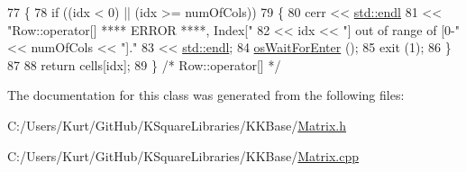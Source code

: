 \begin{DoxyCode}
77 \{
78   \textcolor{keywordflow}{if}  ((idx < 0)  ||  (idx >= numOfCols))
79   \{
80     cerr << \hyperlink{namespace_k_k_b_ad1f50f65af6adc8fa9e6f62d007818a8}{std::endl}
81          << \textcolor{stringliteral}{"Row::operator[]  **** ERROR ****,  Index["} 
82          << idx << \textcolor{stringliteral}{"]  out of range of [0-"} << numOfCols << \textcolor{stringliteral}{"]."}
83          << \hyperlink{namespace_k_k_b_ad1f50f65af6adc8fa9e6f62d007818a8}{std::endl};
84     \hyperlink{namespace_k_k_b_a255aa69aade7f429585349d08973e09f}{osWaitForEnter} ();
85     exit (1);
86   \}
87 
88   \textcolor{keywordflow}{return}  cells[idx];
89 \}  \textcolor{comment}{/*  Row::operator[] */}
\end{DoxyCode}


The documentation for this class was generated from the following files\+:\begin{DoxyCompactItemize}
\item 
C\+:/\+Users/\+Kurt/\+Git\+Hub/\+K\+Square\+Libraries/\+K\+K\+Base/\hyperlink{_matrix_8h}{Matrix.\+h}\item 
C\+:/\+Users/\+Kurt/\+Git\+Hub/\+K\+Square\+Libraries/\+K\+K\+Base/\hyperlink{_matrix_8cpp}{Matrix.\+cpp}\end{DoxyCompactItemize}
